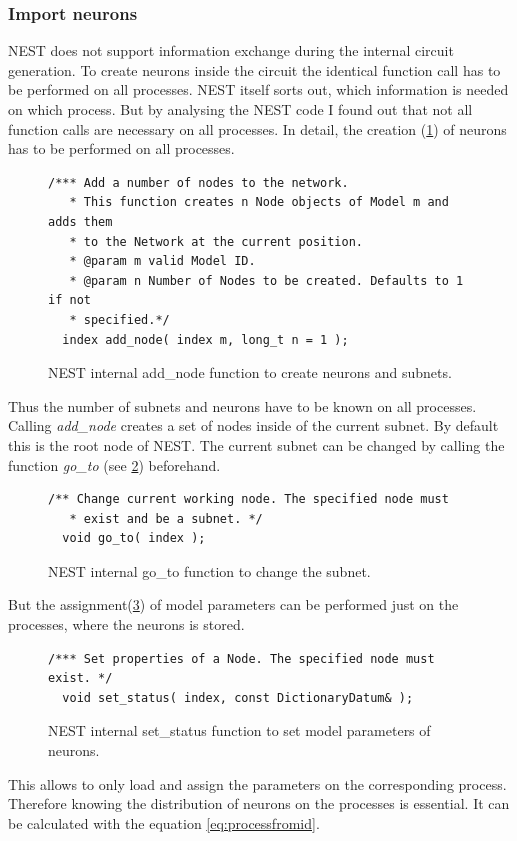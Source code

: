 \subsubsection{Import neurons}
NEST does not support information exchange during the internal circuit generation. 
To create neurons inside the circuit the identical function call has to be
performed on all processes. NEST itself sorts out, which information is needed on which process.
But by analysing the NEST code I found out that not all function calls are necessary on all processes.
In detail, the creation (\ref{code:addnode}) of neurons has to be performed on all processes.
\begin{figure}[ht!]
\begin{lstlisting}[style=cppcode]
/*** Add a number of nodes to the network.
   * This function creates n Node objects of Model m and adds them
   * to the Network at the current position.
   * @param m valid Model ID.
   * @param n Number of Nodes to be created. Defaults to 1 if not
   * specified.*/
  index add_node( index m, long_t n = 1 );
\end{lstlisting}
\caption{NEST internal add\_{}node function to create neurons and subnets.}
\label{code:addnode}
\end{figure}
Thus the number of subnets and neurons have to be known on all processes.
Calling \emph{add\_node} creates a set of nodes inside of the current subnet.
By default this is the root node of NEST.
The current subnet can be changed by calling the function \emph{go\_to} (see \ref{code:goto}) beforehand.
\begin{figure}[ht!]
\begin{lstlisting}[style=cppcode]
/** Change current working node. The specified node must
   * exist and be a subnet. */
  void go_to( index );
\end{lstlisting}
\caption{NEST internal go\_{}to function to change the subnet.}
\label{code:goto}
\end{figure}
But the assignment(\ref{code:setstatus}) of model parameters can be performed just on the processes,
where the neurons is stored.
\begin{figure}[ht!]
\begin{lstlisting}[style=cppcode]
/*** Set properties of a Node. The specified node must exist. */
  void set_status( index, const DictionaryDatum& );
\end{lstlisting}
\caption{NEST internal set\_{}status function to set model parameters of neurons.}
\label{code:setstatus}
\end{figure}
This allows to only load and assign the parameters on the corresponding process.
Therefore knowing the distribution of neurons on the processes is essential.
It can be calculated with the equation \ref{eq:processfromid}.

